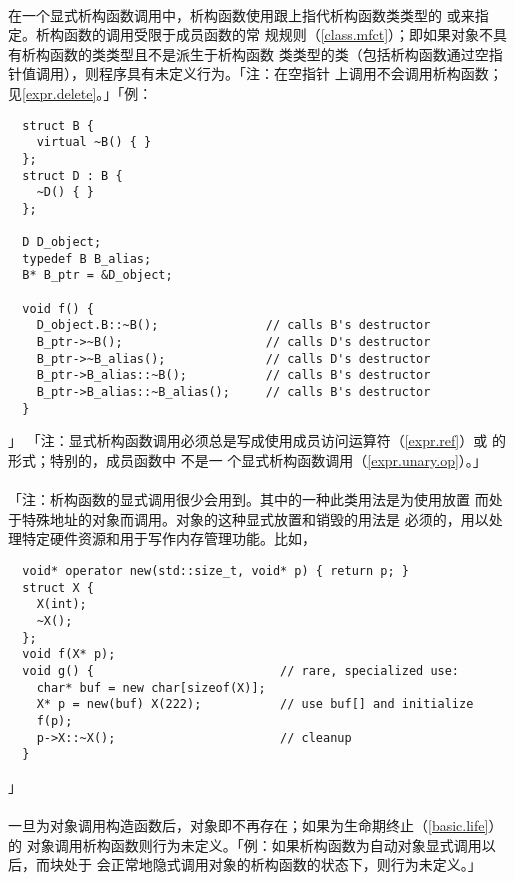 \paragraph{}
在一个显式析构函数调用中，析构函数使用\tm{\~}跟上指代析构函数类类型的
或来指定。析构函数的调用受限于成员函数的常
规规则（\ref{class.mfct}）；即如果对象不具有析构函数的类类型且不是派生于析构函数
类类型的类（包括析构函数通过空指针值调用），则程序具有未定义行为。「注：在空指针
上调用不会调用析构函数；见\ref{expr.delete}。」「例：
\begin{lstlisting}
  struct B {
    virtual ~B() { }
  };
  struct D : B {
    ~D() { }
  };

  D D_object;
  typedef B B_alias;
  B* B_ptr = &D_object;

  void f() {
    D_object.B::~B();               // calls B's destructor
    B_ptr->~B();                    // calls D's destructor
    B_ptr->~B_alias();              // calls D's destructor
    B_ptr->B_alias::~B();           // calls B's destructor
    B_ptr->B_alias::~B_alias();     // calls B's destructor
  }
\end{lstlisting}」
「注：显式析构函数调用必须总是写成使用成员访问运算符（\ref{expr.ref}）或
的形式；特别的，成员函数中 不是一
个显式析构函数调用（\ref{expr.unary.op}）。」

\paragraph{}
「注：析构函数的显式调用很少会用到。其中的一种此类用法是为使用放置
而处于特殊地址的对象而调用。对象的这种显式放置和销毁的用法是
必须的，用以处理特定硬件资源和用于写作内存管理功能。比如，
\begin{lstlisting}
  void* operator new(std::size_t, void* p) { return p; }
  struct X {
    X(int);
    ~X();
  };
  void f(X* p);
  void g() {                          // rare, specialized use:
    char* buf = new char[sizeof(X)];
    X* p = new(buf) X(222);           // use buf[] and initialize
    f(p);
    p->X::~X();                       // cleanup
  }
\end{lstlisting}」

\paragraph{}
一旦为对象调用构造函数后，对象即不再存在；如果为生命期终止（\ref{basic.life}）的
对象调用析构函数则行为未定义。「例：如果析构函数为自动对象显式调用以后，而块处于
会正常地隐式调用对象的析构函数的状态下，则行为未定义。」

